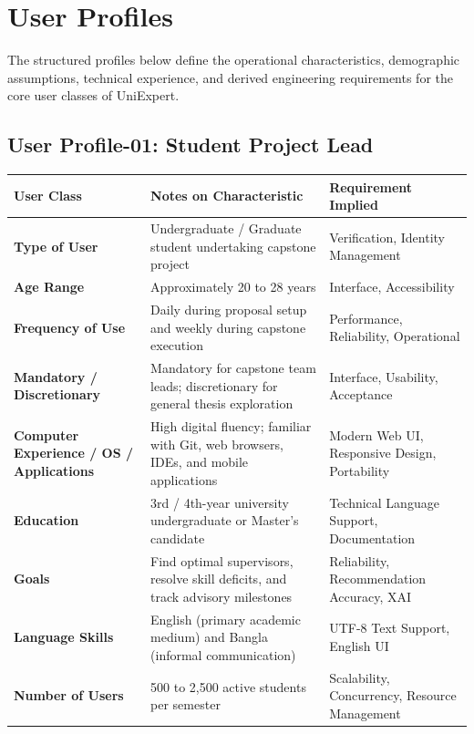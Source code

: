 \section{User Profiles}
\label{sec:user_profiles}

The structured profiles below define the operational characteristics, demographic assumptions, technical experience, and derived engineering requirements for the core user classes of UniExpert.

\subsection{User Profile-01: Student Project Lead}
\label{subsec:profile_student}

\begin{table}[H]
\centering
\small
\begin{tabularx}{\textwidth}{|l|X|p{4.2cm}|}
\hline
\rowcolor{lightgray!40} \textbf{User Class} & \textbf{Notes on Characteristic} & \textbf{Requirement Implied} \\ \hline
\textbf{Type of User} & Undergraduate / Graduate student undertaking capstone project & Verification, Identity Management \\ \hline
\textbf{Age Range} & Approximately 20 to 28 years & Interface, Accessibility \\ \hline
\textbf{Frequency of Use} & Daily during proposal setup and weekly during capstone execution & Performance, Reliability, Operational \\ \hline
\textbf{Mandatory / Discretionary} & Mandatory for capstone team leads; discretionary for general thesis exploration & Interface, Usability, Acceptance \\ \hline
\textbf{Computer Experience / OS / Applications} & High digital fluency; familiar with Git, web browsers, IDEs, and mobile applications & Modern Web UI, Responsive Design, Portability \\ \hline
\textbf{Education} & 3rd / 4th-year university undergraduate or Master's candidate & Technical Language Support, Documentation \\ \hline
\textbf{Goals} & Find optimal supervisors, resolve skill deficits, and track advisory milestones & Reliability, Recommendation Accuracy, XAI \\ \hline
\textbf{Language Skills} & English (primary academic medium) and Bangla (informal communication) & UTF-8 Text Support, English UI \\ \hline
\textbf{Number of Users} & 500 to 2,500 active students per semester & Scalability, Concurrency, Resource Management \\ \hline

\end{tabularx}
\end{table}
